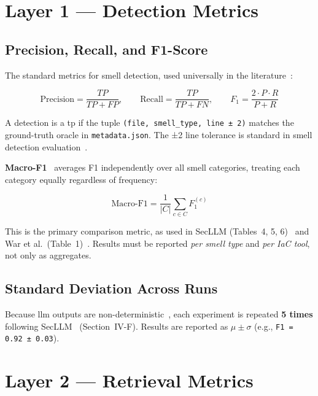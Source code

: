 \documentclass[12pt, a4paper]{report}
\begin{document}
\section{Layer 1 --- Detection Metrics}

\subsection{Precision, Recall, and F1-Score}

The standard metrics for smell detection, used universally in the
literature~\citep{devito2025secllm, war2025detection, saavedra2022glitch, rahman2019seven}:

\begin{equation}
  \text{Precision} = \frac{TP}{TP + FP}, \qquad
  \text{Recall} = \frac{TP}{TP + FN}, \qquad
  F_1 = \frac{2 \cdot P \cdot R}{P + R}
  \label{eq:prf}
\end{equation}

A detection is a \gls{tp} if the tuple \texttt{(file, smell\_type, line ± 2)} matches
the ground-truth oracle in \texttt{metadata.json}. The ±2 line tolerance is standard
in smell detection evaluation~\citep{saavedra2022glitch, rahman2019seven}.

\textbf{Macro-F1}~\citep{devito2025secllm} averages F1 independently over all smell
categories, treating each category equally regardless of frequency:

\begin{equation}
  \text{Macro-F1} = \frac{1}{|C|} \sum_{c \in C} F_1^{(c)}
  \label{eq:macrof1}
\end{equation}

This is the primary comparison metric, as used in SecLLM (Tables~4, 5, 6)~\citep{devito2025secllm}
and War et al.\ (Table~1)~\citep{war2025detection}. Results must be reported
\emph{per smell type} and \emph{per IaC tool}, not only as aggregates.

\subsection{Standard Deviation Across Runs}

Because \gls{llm} outputs are non-deterministic~\citep{ouyang2025nondeterminism},
each experiment is repeated \textbf{5 times} following SecLLM~\citep{devito2025secllm}
(Section~IV-F). Results are reported as $\mu \pm \sigma$ (e.g., \texttt{F1 = 0.92 ± 0.03}).

\section{Layer 2 --- Retrieval Metrics}
\end{document}
